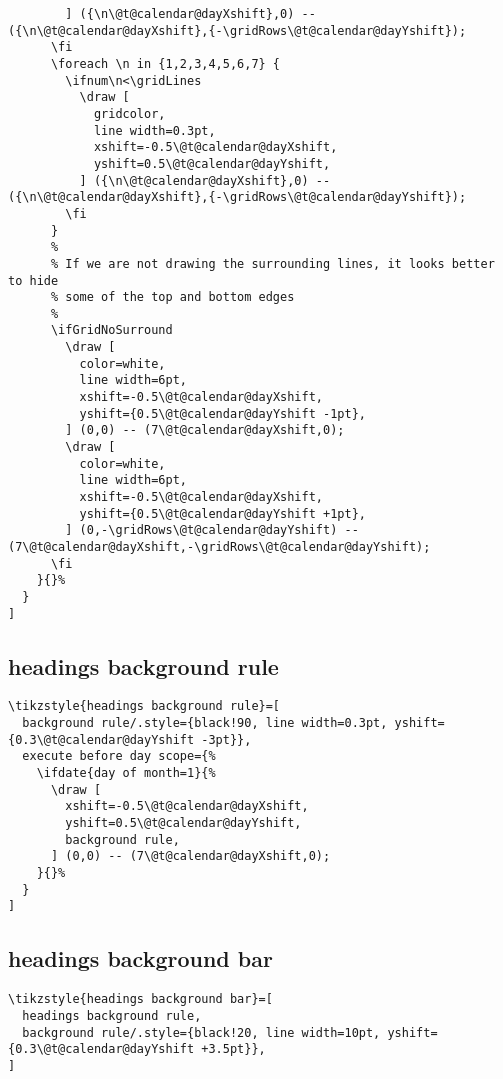 \documentclass[11pt,oneside]{memoir-article}
\begin{document}
\begin{verbatim}
        ] ({\n\@t@calendar@dayXshift},0) -- ({\n\@t@calendar@dayXshift},{-\gridRows\@t@calendar@dayYshift});
      \fi
      \foreach \n in {1,2,3,4,5,6,7} {
        \ifnum\n<\gridLines
          \draw [
            gridcolor,
            line width=0.3pt,
            xshift=-0.5\@t@calendar@dayXshift,
            yshift=0.5\@t@calendar@dayYshift,
          ] ({\n\@t@calendar@dayXshift},0) -- ({\n\@t@calendar@dayXshift},{-\gridRows\@t@calendar@dayYshift});
        \fi
      }
      %
      % If we are not drawing the surrounding lines, it looks better to hide
      % some of the top and bottom edges
      %
      \ifGridNoSurround
        \draw [
          color=white,
          line width=6pt,
          xshift=-0.5\@t@calendar@dayXshift,
          yshift={0.5\@t@calendar@dayYshift -1pt},
        ] (0,0) -- (7\@t@calendar@dayXshift,0);
        \draw [
          color=white,
          line width=6pt,
          xshift=-0.5\@t@calendar@dayXshift,
          yshift={0.5\@t@calendar@dayYshift +1pt},
        ] (0,-\gridRows\@t@calendar@dayYshift) -- (7\@t@calendar@dayXshift,-\gridRows\@t@calendar@dayYshift);
      \fi
    }{}%
  }
]
\end{verbatim}

\subsection{headings background rule}
\label{sec-10-6-3}

\begin{verbatim}
\tikzstyle{headings background rule}=[
  background rule/.style={black!90, line width=0.3pt, yshift={0.3\@t@calendar@dayYshift -3pt}},
  execute before day scope={%
    \ifdate{day of month=1}{%
      \draw [
        xshift=-0.5\@t@calendar@dayXshift,
        yshift=0.5\@t@calendar@dayYshift,
        background rule,
      ] (0,0) -- (7\@t@calendar@dayXshift,0);
    }{}%
  }
]
\end{verbatim}

\subsection{headings background bar}
\label{sec-10-6-4}

\begin{verbatim}
\tikzstyle{headings background bar}=[
  headings background rule,
  background rule/.style={black!20, line width=10pt, yshift={0.3\@t@calendar@dayYshift +3.5pt}},
]
\end{verbatim}
\end{document}

